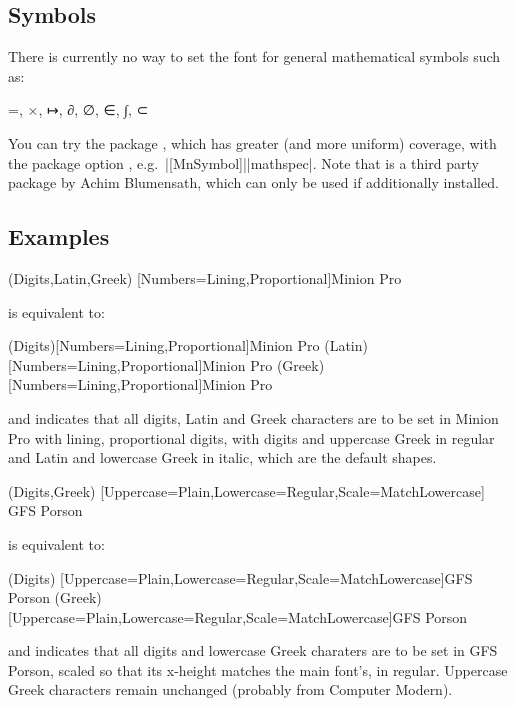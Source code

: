 \documentclass{ltxdockit}
\newcommand\MP[1]{{\MathematicalPi #1}}
\newcommand\permitbreak{\linebreak[0]}
\begin{document}
\subsection{Symbols}

There is currently no way to set the font for general mathematical symbols such as:
\begin{center}
\MP =, \MP ×, \MP ↦, \MP ∂, \MP ∅, \MP ∈, \MP ∫, \MP ⊂
\end{center}
You can try the package , which has greater (and more uniform) coverage, with the package option , e.g.\ |[MnSymbol]|\permitbreak|{mathspec}|. Note that  is a third party package by Achim Blumensath, which can only be used if additionally installed.

\subsection{Examples}

\begin{example}
\setmathsfont(Digits,Latin,Greek)
    [Numbers={Lining,Proportional}]{Minion Pro}
\end{example}
is equivalent to:
\begin{example}
\setmathsfont(Digits)[Numbers={Lining,Proportional}]{Minion Pro}
\setmathsfont(Latin)[Numbers={Lining,Proportional}]{Minion Pro}
\setmathsfont(Greek)[Numbers={Lining,Proportional}]{Minion Pro}
\end{example}
and indicates that all digits, Latin and Greek characters are to be set in Minion Pro with lining, proportional digits, with digits and uppercase Greek in regular and Latin and lowercase Greek in italic, which are the default shapes.

\bigskip

\begin{example}
\setmathsfont(Digits,Greek)
    [Uppercase=Plain,Lowercase=Regular,Scale=MatchLowercase]
    {GFS Porson}
\end{example}
is equivalent to:
\begin{example}
\setmathsfont(Digits)
    [Uppercase=Plain,Lowercase=Regular,Scale=MatchLowercase]{GFS Porson}
\setmathsfont(Greek)
    [Uppercase=Plain,Lowercase=Regular,Scale=MatchLowercase]{GFS Porson}
\end{example}
and indicates that all digits and lowercase Greek charaters are to be set in GFS Porson, scaled so that its x-height matches the main font’s, in regular. Uppercase Greek characters remain unchanged (probably from Computer Modern).
\end{document}
